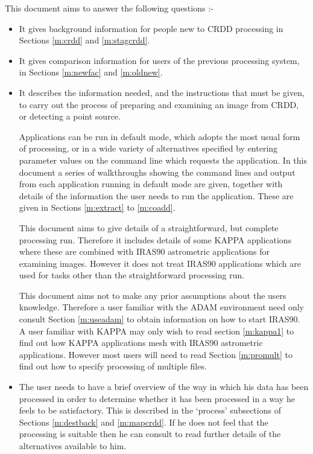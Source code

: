 \documentclass[twoside,11pt]{starlink}
\begin{document}
This document aims to answer the following questions :-
\begin{itemize}

\item It gives background information for people new to CRDD processing in
Sections \ref{m:crdd} and \ref{m:stagcrdd}.

\item It gives comparison information for users of the previous processing
system, in Sections \ref{m:newfac} and \ref{m:oldnew}.

\item It describes the information needed, and the instructions that must be
given, to carry out the process of preparing and examining an image from CRDD,
or detecting a point source.

Applications can be run in default mode, which adopts the most usual form of
processing, or in a wide variety of alternatives specified by entering parameter
values on the command line which requests the application. In this document a
series of walkthroughs showing the command lines and output from each
application running in default mode are given, together with details of the
information the user needs to run the application. These are given in
Sections \ref{m:extract} to \ref{m:coadd}.

This document aims to give details of a straightforward, but complete processing
run. Therefore it includes details of some KAPPA applications where these are
combined with IRAS90 astrometric applications for examining images. However it
does not treat IRAS90 applications which are used for tasks other than the
straightforward processing run.

This document aims not to make any prior assumptions about the users knowledge.
Therefore a user familiar with the ADAM environment need only consult Section
\ref{m:useadam} to obtain information on how to start IRAS90. A user familiar
with KAPPA may only wish to read section \ref{m:kappa1} to find out how KAPPA
applications mesh with IRAS90 astrometric applications. However most users will
need to read Section \ref{m:promult} to find out how to specify processing of
multiple files.

\item The user needs to have a brief overview of the way in which his data has
been processed in order to determine whether it has been processed in a way he
feels to be satisfactory. This is described in the `process' subsections of
Sections \ref{m:destback} and \ref{m:mapcrdd}. If he does not feel that
the processing is suitable then he can consult
 to read further details
of the alternatives available to him.


\end{itemize}
\end{document}
